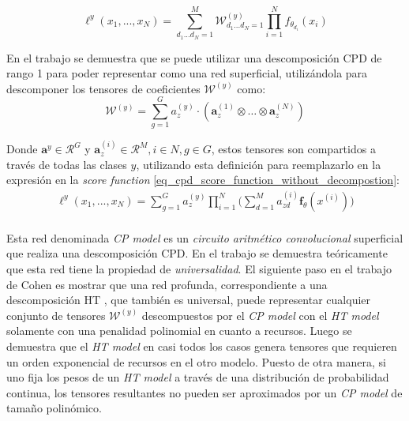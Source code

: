 \documentclass[spanish]{article}
\theoremstyle{definition}
\theoremstyle{remark}
\numberwithin{equation}{section}
\numberwithin{equation}{section} %
\begin{document}
\begin{equation}
\label{eq_cpd_score_function_without_decompostion}
 \ell^y(x_1,...,x_N)=\sum^{M}_{d_1...d_N=1} \mathcal{W}^{(y)}_{d_1...d_N=1} \prod^N_{i=1} f_{\theta_{d_i}}(x_i)
\end{equation}\par
\par
En el trabajo se demuestra que se puede utilizar una descomposición CPD de rango 1 para poder representar como una red superficial, utilizándola para descomponer los tensores de coeficientes $\mathcal{W}^{(y)}$ como:
\begin{equation}
\label{eq_cpd_tensor_coeficients}
\mathcal{W}^{(y)} = \sum_{g=1}^G a_z^{(y)} \cdot (\boldsymbol{a}^{(1)}_z \otimes \ldots \otimes \boldsymbol{a}^{(N)}_z)
\end{equation}\par
Donde $\boldsymbol{a}^{y} \in \mathcal{R}^G$ y $\boldsymbol{a}^{(i)}_z \in \mathcal{R}^{M}, i \in N, g \in G $, estos tensores son compartidos a través de todas las clases $y$, utilizando esta definición para reemplazarlo en la expresión en la \textit{score function} \eqref{eq_cpd_score_function_without_decompostion}:
\begin{equation}
\label{eq_cpd_score_function}
\begin{split}
 \ell^y(x_1,...,x_N) = \sum_{g=1}^G a_z^{(y)} \prod^N_{i=1} \Big(\sum_{d=1}^M a^{(i)}_{zd} \boldsymbol{f}_\theta(x^{(i)})\Big)
  \\ 
\end{split}
\end{equation}\par
\par
Esta red denominada \textit{CP model} es un \textit{circuito aritmético convolucional} superficial que realiza una descomposición CPD. En el trabajo se demuestra teóricamente que esta red tiene la propiedad de \textit{universalidad}. El siguiente paso en el trabajo de Cohen es mostrar que una red profunda, correspondiente a una descomposición HT \cite{hackbusch2009new}, que también es universal, puede representar cualquier conjunto de tensores $\mathcal{W}^{(y)}$ descompuestos por el \textit{CP model} con el \textit{HT model} solamente con una penalidad polinomial en cuanto a recursos. Luego se demuestra que el \textit{HT model} en casi todos los casos genera tensores que requieren un orden exponencial de recursos en el otro modelo. Puesto de otra manera, si uno fija los pesos de un  \textit{HT model} a través de  una distribución de probabilidad continua, los tensores resultantes no pueden ser aproximados por un \textit{CP model} de tamaño polinómico. 
\end{document}
